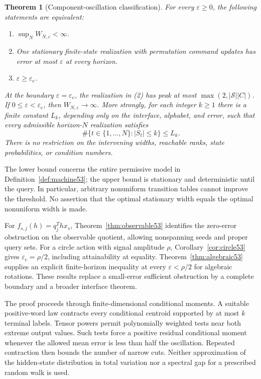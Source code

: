 \documentclass[11pt]{amsart}
\numberwithin{equation}{section}
\newtheorem{theorem}{Theorem}[section]
\theoremstyle{definition}
\theoremstyle{remark}
\newcommand{\epsc}{\varepsilon_{\mathrm c}}
\begin{document}
\begin{theorem}[Component-oscillation classification]\label{thm:classification53}
For every $\varepsilon\ge0$, the following statements are equivalent:
\begin{enumerate}
\item $\sup_N W_{N,\varepsilon}<\infty$.
\item One stationary finite-state realization with permutation command updates has error at most $\varepsilon$ at every horizon.
\item $\varepsilon\ge\epsc$.
\end{enumerate}
At the boundary $\varepsilon=\epsc$, the realization in (2) has peak at most $\max(2,|\mathcal S||C|)$. If $0\le\varepsilon<\epsc$, then $W_{N,\varepsilon}\to\infty$. More strongly, for each integer $k\ge1$ there is a finite constant $L_k$, depending only on the interface, alphabet, and error, such that every admissible horizon-$N$ realization satisfies
\begin{equation}\label{eq:occupation53}
 \#\{t\in\{1,\ldots,N\}:|S_t|\le k\}\le L_k.
\end{equation}
There is no restriction on the intervening widths, reachable ranks, state probabilities, or condition numbers.
\end{theorem}

The lower bound concerns the entire permissive model in Definition~\ref{def:machine53}; the upper bound is stationary and deterministic until the query. In particular, arbitrary nonuniform transition tables cannot improve the threshold. No assertion that the optimal stationary width equals the optimal nonuniform width is made.

For $f_{s,j}(h)=q_j^Thx_s$, Theorem~\ref{thm:observable53} identifies the zero-error obstruction on the observable quotient, allowing nonspanning seeds and proper query sets. For a circle action with signal amplitude $\rho$, Corollary~\ref{cor:circle53} gives $\epsc=\rho/2$, including attainability at equality. Theorem~\ref{thm:algebraic53} supplies an explicit finite-horizon inequality at every $\varepsilon<\rho/2$ for algebraic rotations. These results replace a small-error sufficient obstruction by a complete boundary and a broader interface theorem.

The proof proceeds through finite-dimensional conditional moments. A suitable positive-word law contracts every conditional centroid supported by at most $k$ terminal labels. Tensor powers permit polynomially weighted tests near both extreme output values. Such tests force a positive residual conditional moment whenever the allowed mean error is less than half the oscillation. Repeated contraction then bounds the number of narrow cuts. Neither approximation of the hidden-state distribution in total variation nor a spectral gap for a prescribed random walk is used.
\end{document}
